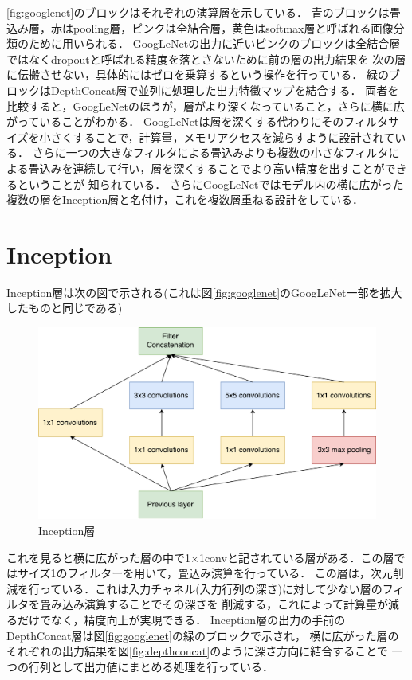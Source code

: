 {\ref{fig:googlenet}のブロックはそれぞれの演算層を示している．
青のブロックは畳込み層，赤はpooling層，ピンクは全結合層，黄色はsoftmax層と呼ばれる画像分類のために用いられる．
GoogLeNetの出力に近いピンクのブロックは全結合層ではなくdropoutと呼ばれる精度を落とさないために前の層の出力結果を
次の層に伝搬させない，具体的にはゼロを乗算するという操作を行っている．
緑のブロックはDepthConcat層で並列に処理した出力特徴マップを結合する．
両者を比較すると，GoogLeNetのほうが，層がより深くなっていること，さらに横に広がっていることがわかる．
GoogLeNetは層を深くする代わりにそのフィルタサイズを小さくすることで，計算量，メモリアクセスを減らすように設計されている．
さらに一つの大きなフィルタによる畳込みよりも複数の小さなフィルタによる畳込みを連続して行い，層を深くすることでより高い精度を出すことができるということが
知られている\cite{nin}．
さらにGoogLeNetではモデル内の横に広がった複数の層をInception層と名付け，これを複数層重ねる設計をしている．

\section{Inception}
\label{sec:inception}
Inception層は次の図で示される(これは図\ref{fig:googlenet}のGoogLeNet一部を拡大したものと同じである)

\begin{figure}[h]
  \centering
  \includegraphics[scale=0.5]{./chap2/fig/inception.pdf}
  \caption{Inception層}
  \label{fig:inception}
\end{figure}

これを見ると横に広がった層の中で1$\times$1convと記されている層がある．この層ではサイズ1のフィルターを用いて，畳込み演算を行っている．
この層は，次元削減を行っている．これは入力チャネル(入力行列の深さ)に対して少ない層のフィルタを畳み込み演算することでその深さを
削減する，これによって計算量が減るだけでなく，精度向上が実現できる．
Inception層の出力の手前のDepthConcat層は図\ref{fig:googlenet}の緑のブロックで示され，
横に広がった層のそれぞれの出力結果を図\ref{fig:depthconcat}のように深さ方向に結合することで
一つの行列として出力値にまとめる処理を行っている．

}
